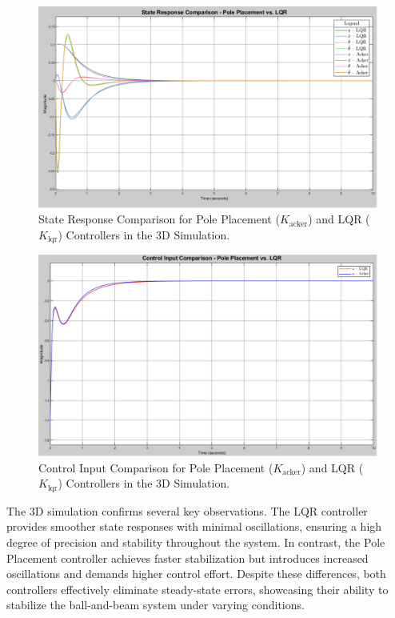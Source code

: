\documentclass[conference]{IEEEtran}
\begin{document}
\begin{figure}[H]
    \centering
    \includegraphics[width=0.8\linewidth]{figures/states_compare_scope.png}
    \caption{State Response Comparison for Pole Placement (\(K_{\text{acker}}\)) and LQR (\(K_{\text{lqr}}\)) Controllers in the 3D Simulation.}
    \label{fig:state_compare}
\end{figure}

\begin{figure}[H]
    \centering
    \includegraphics[width=0.8\linewidth]{figures/control_input_compare.png}
    \caption{Control Input Comparison for Pole Placement (\(K_{\text{acker}}\)) and LQR (\(K_{\text{lqr}}\)) Controllers in the 3D Simulation.}
    \label{fig:control_input_compare}
\end{figure}

The 3D simulation confirms several key observations. The LQR controller provides smoother state responses with minimal oscillations, ensuring a high degree of precision and stability throughout the system. In contrast, the Pole Placement controller achieves faster stabilization but introduces increased oscillations and demands higher control effort. Despite these differences, both controllers effectively eliminate steady-state errors, showcasing their ability to stabilize the ball-and-beam system under varying conditions.
\end{document}
